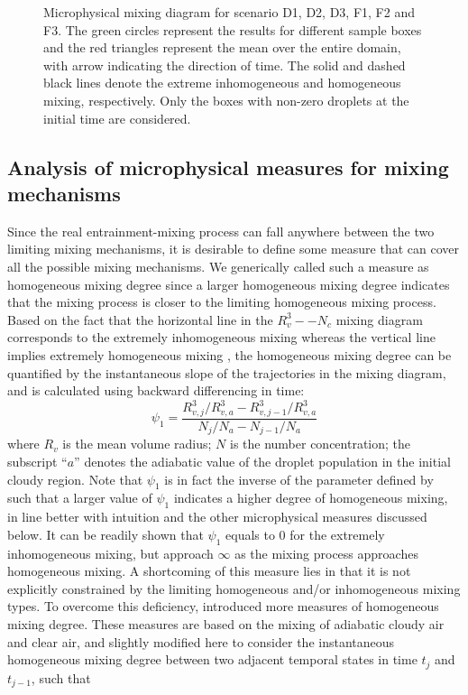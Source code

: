 \documentclass[draft,linenumbers]{agujournal}
\begin{document}
\begin{figure}[!htbp]
\caption{Microphysical mixing diagram for scenario D1, D2, D3, F1, F2 and F3. The green
circles represent the results for different sample boxes and the red triangles represent the mean over the entire domain, with arrow indicating the direction of time. The solid and dashed black lines denote the extreme inhomogeneous and homogeneous mixing, respectively. Only the boxes with non-zero droplets at the initial time are considered.}
\label{fig:mixing_diagram}
\end{figure}

\subsection{Analysis of microphysical measures for mixing mechanisms}
Since the real entrainment-mixing process can fall anywhere between the two limiting mixing mechanisms, it is desirable to define some measure that can cover all the possible mixing mechanisms. We generically called such a measure as homogeneous mixing degree since a larger homogeneous mixing degree indicates that the mixing process is closer to the limiting homogeneous mixing process. Based on the fact that the horizontal line in the $R_v^3−-N_c$ mixing diagram corresponds to the extremely inhomogeneous mixing whereas the vertical line implies extremely homogeneous mixing \citep{And09, Lu2013}, the homogeneous mixing degree can be quantified by the instantaneous slope of the trajectories in the mixing diagram, and is calculated using backward differencing in time: 
\begin{equation}
\psi_1 = \frac{R_{v,j}^3/R_{v,a}^3 - R_{v,j-1}^3/R_{v,a}^3}{N_{j}/N_a - N_{j-1}/N_a}
\label{phi1}
\end{equation}
where $R_v$ is the mean volume radius; $N$ is the number concentration; the subscript ``$a$'' denotes the adiabatic value of the droplet population in the initial cloudy region. Note that $\psi_1$ is in fact the inverse of the parameter defined by \citet{And09} such that a larger value of $\psi_1$ indicates a higher degree of homogeneous mixing, in line better with intuition and the other microphysical measures discussed below. It can be readily shown that $\psi_1$ equals to $0$ for the extremely inhomogeneous mixing, but approach $\infty$ as the mixing process approaches homogeneous mixing. A shortcoming of this measure lies in that it is not explicitly constrained by the limiting homogeneous and/or inhomogeneous mixing types. To overcome this deficiency, \citet{Lu2013, Lu2014} introduced more measures of homogeneous mixing degree. These measures are based on the mixing of adiabatic cloudy air and clear air, and slightly modified here to consider the instantaneous homogeneous mixing degree between two adjacent 
temporal states in time $t_j$ and $t_{j-1}$, such that
  
\end{document}
